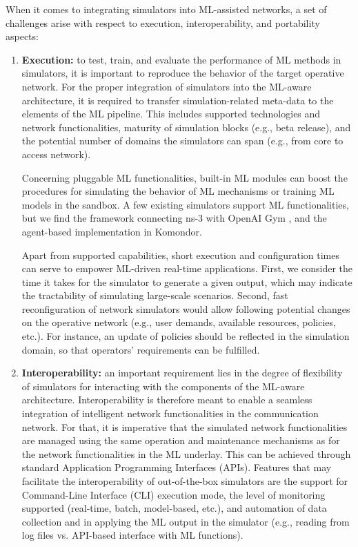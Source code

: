 \documentclass[journal]{IEEEtran}
\begin{document}
	When it comes to integrating simulators into ML-assisted networks, a set of challenges arise with respect to execution, interoperability, and portability aspects:
	\begin{enumerate}
	    \item \textbf{Execution:} to test, train, and evaluate the performance of ML methods in simulators, it is important to reproduce the behavior of the target operative network. For the proper integration of simulators into the ML-aware architecture, it is required to transfer simulation-related meta-data to the elements of the ML pipeline. This includes supported technologies and network functionalities, maturity of simulation blocks (e.g., beta release), and the potential number of domains the simulators can span (e.g., from core to access network).
	            
	    Concerning pluggable ML functionalities, built-in ML modules can boost the procedures for simulating the behavior of ML mechanisms or training ML models in the sandbox. A few existing simulators support ML functionalities, but we find the framework connecting ns-3 with OpenAI Gym \cite{gawlowicz2019ns}, and the agent-based implementation in Komondor.
	    
        Apart from supported capabilities, short execution and configuration times can serve to empower ML-driven real-time applications. First, we consider the time it takes for the simulator to generate a given output, which may indicate the tractability of simulating large-scale scenarios. Second, fast reconfiguration of network simulators would allow following potential changes on the operative network (e.g., user demands, available resources, policies, etc.). For instance, an update of policies should be reflected in the simulation domain, so that operators' requirements can be fulfilled. 
        
        \item \textbf{Interoperability:} an important requirement lies in the degree of flexibility of simulators for interacting with the components of the ML-aware architecture. Interoperability is therefore meant to enable a seamless integration of intelligent network functionalities in the communication network. For that, it is imperative that the simulated network functionalities are managed using the same operation and maintenance mechanisms as for the network functionalities in the ML underlay. This can be achieved through standard Application Programming Interfaces (APIs). Features that may facilitate the interoperability of out-of-the-box simulators are the support for Command-Line Interface (CLI) execution mode, the level of monitoring supported (real-time, batch, model-based, etc.), and automation of data collection and in applying the ML output in the simulator (e.g., reading from log files vs. API-based interface with ML functions).


\end{enumerate}
\end{document}
